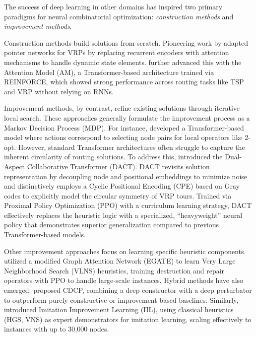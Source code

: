 \documentclass[letterpaper]{article} %
\begin{document}
The success of deep learning in other domains has inspired two primary paradigms for neural combinatorial optimization: \textit{construction methods} and \textit{improvement methods}.

Construction methods build solutions from scratch. Pioneering work by \citet{nazari_reinforcement_2018} adapted pointer networks for VRPs by replacing recurrent encoders with attention mechanisms to handle dynamic state elements. \citet{kool_attention_2019} further advanced this with the Attention Model (AM), a Transformer-based architecture trained via REINFORCE, which showed strong performance across routing tasks like TSP and VRP without relying on RNNs.

Improvement methods, by contrast, refine existing solutions through iterative local search. These approaches generally formulate the improvement process as a Markov Decision Process (MDP). For instance, \citet{wu_learning_2022} developed a Transformer-based model where actions correspond to selecting node pairs for local operators like 2-opt. However, standard Transformer architectures often struggle to capture the inherent circularity of routing solutions. To address this, \citet{ma_learning_2021} introduced the Dual-Aspect Collaborative Transformer (DACT). DACT revisits solution representation by decoupling node and positional embeddings to minimize noise and distinctively employs a Cyclic Positional Encoding (CPE) based on Gray codes to explicitly model the circular symmetry of VRP tours. Trained via Proximal Policy Optimization (PPO) with a curriculum learning strategy, DACT effectively replaces the heuristic logic with a specialized, ``heavyweight'' neural policy that demonstrates superior generalization compared to previous Transformer-based models.

Other improvement approaches focus on learning specific heuristic components. \citet{gao_learn_2020} utilized a modified Graph Attention Network (EGATE) to learn Very Large Neighborhood Search (VLNS) heuristics, training destruction and repair operators with PPO to handle large-scale instances. Hybrid methods have also emerged: \citet{garcia-torres_combining_2022} proposed CDCP, combining a deep constructor with a deep perturbator to outperform purely constructive or improvement-based baselines. Similarly, \citet{bui_imitation_2023} introduced Imitation Improvement Learning (IIL), using classical heuristics (HGS, VNS) as expert demonstrators for imitation learning, scaling effectively to instances with up to 30,000 nodes.
\end{document}

